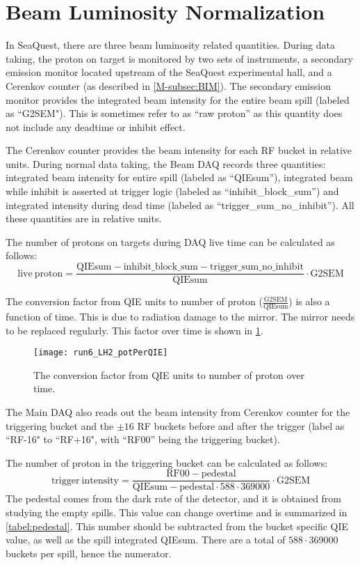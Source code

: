 \documentclass[../main.tex]{subfiles}
\begin{document}
\section{Beam Luminosity Normalization}
\label{sec:beam_norm}
In SeaQuest, there are three beam luminosity related quantities.
During data taking, the proton on target is monitored by two sets of instruments, a secondary
emission monitor located upstream of the SeaQuest experimental hall, and a Cerenkov counter
(as described in \cref{M-subsec:BIM}). The secondary emission monitor provides the integrated
beam intensity for the entire beam spill (labeled as ``G2SEM"). This is sometimes refer to as
``raw proton'' as this quantity does not include any deadtime or inhibit effect.

The Cerenkov counter provides the beam intensity for each RF bucket in relative units.
During normal data taking, the Beam DAQ records three quantities: integrated beam intensity for entire spill
(labeled as ``QIEsum''), integrated beam while inhibit is asserted at trigger logic
(labeled as ``inhibit\_block\_sum'') and integrated intensity during dead time (labeled as
``trigger\_sum\_no\_inhibit''). All these quantities are in relative units.

The number of protons on targets during DAQ live time can be calculated as follows:
\begin{equation}
	\mathrm{live\ proton} = \frac{\mathrm{QIEsum}-\mathrm{inhibit\_block\_sum}-\mathrm{trigger\_sum\_no\_inhibit}}{\mathrm{QIEsum}}\cdot \mathrm{G2SEM}
\end{equation}

The conversion factor from QIE units to number of proton ($\frac{\mathrm{G2SEM}}{\mathrm{QIEsum}}$)
is also a function of time. This is due to radiation damage to the mirror. The mirror needs to be replaced
regularly. This factor over time is shown in \cref{fig:potperQIE}.
\begin{figure}
	\centering
	\texttt{[image: run6\_LH2\_potPerQIE]}
	\caption{The conversion factor from QIE units to number of proton over time.}
	\label{fig:potperQIE}
\end{figure}

The Main DAQ also reads out the beam intensity from Cerenkov counter for the triggering bucket
and the $\pm16$ RF buckets before and after the trigger (label as ``RF-16" to ``RF+16", with
``RF00'' being the triggering bucket).

The number of proton in the triggering bucket can be calculated as follows:
\begin{equation}
	\mathrm{trigger\ intensity} = \frac{\mathrm{RF00}-\mathrm{pedestal}}{\mathrm{QIEsum}-\mathrm{pedestal}\cdot 588\cdot 369000}\cdot \mathrm{G2SEM}
\end{equation}
The pedestal comes from the dark rate of the detector, and it is obtained from studying the
empty spills. This value can change overtime and is summarized in \cref{tabel:pedestal}.
This number should be subtracted from the bucket specific QIE value, as well as the spill
integrated QIEsum. There are a total of $588\cdot 369000$ buckets per spill, hence the
numerator.
\end{document}
